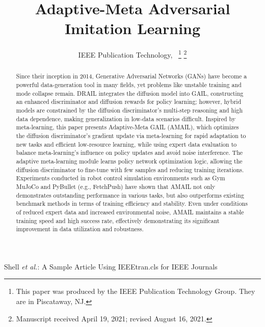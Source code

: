 \documentclass[lettersize,journal]{IEEEtran}
\begin{document}
\title{Adaptive-Meta Adversarial Imitation Learning}

\author{IEEE Publication Technology,~
\thanks{This paper was produced by the IEEE Publication Technology Group. They are in Piscataway, NJ.}%
\thanks{Manuscript received April 19, 2021; revised August 16, 2021.}}

%
{Shell \MakeLowercase{\textit{et al.}}: A Sample Article Using IEEEtran.cls for IEEE Journals}


\maketitle

\begin{abstract}
Since their inception in 2014, Generative Adversarial Networks (GANs) have become a powerful data-generation tool in many fields, yet problems like unstable training and mode collapse remain. DRAIL integrates the diffusion model into GAIL, constructing an enhanced discriminator and diffusion rewards for policy learning; however, hybrid models are constrained by the diffusion discriminator's multi-step reasoning and high data dependence, making generalization in low-data scenarios difficult. Inspired by meta-learning, this paper presents Adaptive-Meta GAIL (AMAIL), which optimizes the diffusion discriminator's gradient update via meta-learning for rapid adaptation to new tasks and efficient low-resource learning, while using expert data evaluation to balance meta-learning's influence on policy updates and avoid noise interference. The adaptive meta-learning module learns policy network optimization logic, allowing the diffusion discriminator to fine-tune with few samples and reducing training iterations. Experiments conducted in robot control simulation environments such as Gym MuJoCo and PyBullet (e.g., FetchPush) have shown that AMAIL not only demonstrates outstanding performance in various tasks, but also outperforms existing benchmark methods in terms of training efficiency and stability. Even under conditions of reduced expert data and increased environmental noise, AMAIL maintains a stable training speed and high success rate, effectively demonstrating its significant improvement in data utilization and robustness.
\end{abstract}
\end{document}
